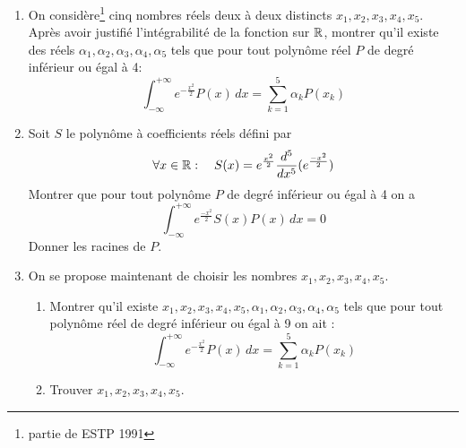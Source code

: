 \begin{enumerate}
\item On considère\footnote{partie de ESTP 1991} cinq nombres réels deux à deux distincts
$x_1,x_2,x_3,x_4,x_5$. \newline
Après avoir justifié l'intégrabilité de la fonction sur $\Bbb R$, montrer
qu'il existe des réels $\alpha_1,\alpha_2,\alpha_3,\alpha_4,\alpha_5$
tels que pour tout polynôme réel $P$ de degré inférieur ou égal à 4:
\[\int_{-\infty}^{+\infty}e^{-\frac{x^2}{2}}P(x)\,dx=\sum_{k=1}^{5}\alpha_k
P(x_k)\]
\item Soit $S$ le polynôme à coefficients réels défini par 
\[\forall x \in \Bbb R :\quad
S(x)=e^{\frac{x^2}{2}}\frac{d^5}{dx^5}(e^{\frac{-x^2}{2}})\]
Montrer que pour tout polynôme $P$ de degré inférieur ou égal à 4 on a 
\[\int_{-\infty}^{+\infty}e^{\frac{-x^2}{2}}S(x)P(x)\,dx=0\]
Donner les racines de $P$.
\item On se propose maintenant de choisir les nombres $x_1,x_2,x_3,x_4,x_5$. \begin{enumerate}
\item Montrer qu'il existe
$x_1,x_2,x_3,x_4,x_5,\alpha_1,\alpha_2,\alpha_3,\alpha_4,\alpha_5$
tels que pour tout polynôme réel de degré inférieur ou égal à 9 on ait
:
\[\int_{-\infty}^{+\infty}e^{-\frac{x^2}{2}}P(x)\,dx=\sum_{k=1}^{5}\alpha_k
P(x_k)\]
\item Trouver $x_1,x_2,x_3,x_4,x_5$. 
\end{enumerate} 
\end{enumerate} 
